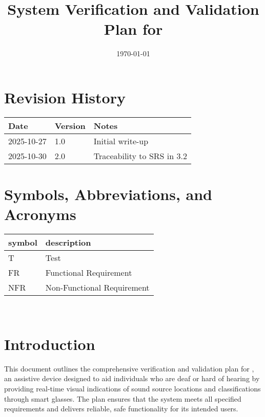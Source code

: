 \documentclass[12pt, titlepage]{article}
\begin{document}
\title{System Verification and Validation Plan for \progname{}} 
\author{\authname}
\date{\today}
	
\maketitle




\section*{Revision History}

\begin{tabularx}{\textwidth}{|p{3cm}|p{2cm}|X|}
\hline
{\bf Date} & {\bf Version} & {\bf Notes}\\
\hline
2025-10-27 & 1.0 & Initial write-up\\
2025-10-30 & 2.0 & Traceability to SRS in 3.2 \\
\hline
\end{tabularx}

\newpage

\tableofcontents


\newpage

\section{Symbols, Abbreviations, and Acronyms}

\renewcommand{\arraystretch}{1.2}
\begin{tabular}{|l|l|} 
  \hline	
  \textbf{symbol} & \textbf{description}\\
  \hline
  T & Test\\
  FR & Functional Requirement\\
  NFR & Non-Functional Requirement\\
  \hline
\end{tabular}\\


\newpage


\section{Introduction}

This document outlines the comprehensive verification and validation plan for
\progname{}, an assistive device designed to aid individuals who are deaf or
hard of hearing by providing real-time visual indications of sound source
locations and classifications through smart glasses. The plan ensures that the
system meets all specified requirements and delivers reliable, safe
functionality for its intended users.
\end{document}
